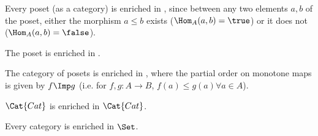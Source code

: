 \begin{example}
\label{ex:enrichbool}Every poset (as a category) is enriched in \Bool, since between any two elements $a,b$ of the poset, either the morphism $a \leq b$ exists ($\Hom_A(a,b) = \true$) or it does not ($\Hom_A(a,b) = \false$).
\end{example}

\begin{example}
The poset \Bool is enriched in \Bool.
\end{example}

\begin{example}
The category \Pos of posets is enriched in \Pos, where the partial order on monotone maps is given by $f \Imp g$ (i.e. for $f,g : A \to B$, $f(a) \leq g(a) \forall a \in A$).
\end{example}

%

\begin{example}
$\Cat{Cat}$ is enriched in $\Cat{Cat}$.
\end{example}

\begin{example}
Every category is enriched in $\Set$.
\end{example}


